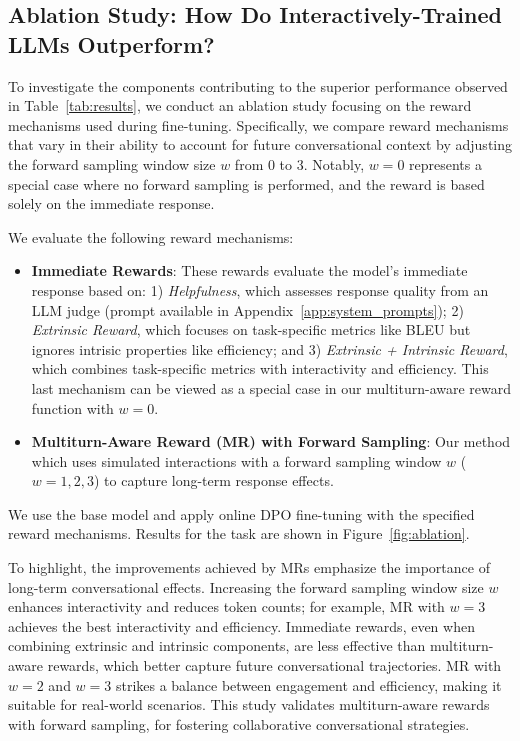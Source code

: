 \subsection{Ablation Study: How Do Interactively-Trained LLMs Outperform?}
\label{sec:ablation}

To investigate the components contributing to the superior performance observed in Table~\ref{tab:results}, we conduct an ablation study focusing on the reward mechanisms used during fine-tuning. Specifically, we compare reward mechanisms that vary in their ability to account for future conversational context by adjusting the forward sampling window size $w$ from 0 to 3. Notably, $w=0$ represents a special case where no forward sampling is performed, and the reward is based solely on the immediate response.

We evaluate the following reward mechanisms:
\begin{itemize}[leftmargin=*]
     \item \textbf{Immediate Rewards}: These rewards evaluate the model's immediate response based on:
        1) \textit{Helpfulness}, which assesses response quality from an LLM judge (prompt available in Appendix~\ref{app:system_prompts}); 
        2) \textit{Extrinsic Reward}, which focuses on task-specific metrics like BLEU but ignores intrisic properties like efficiency; and 
        3) \textit{Extrinsic + Intrinsic Reward}, which combines task-specific metrics with interactivity and efficiency. This last mechanism can be viewed as a special case in our multiturn-aware reward function with $w=0$.
    
    \item \textbf{Multiturn-Aware Reward (MR) with Forward Sampling}: Our method which uses simulated interactions with a forward sampling window $w$ ($w=1,2,3$) to capture long-term response effects.
\end{itemize}

We use the \llama base model and apply online DPO fine-tuning with the specified reward mechanisms. Results for the \doc task are shown in Figure~\ref{fig:ablation}.

To highlight, the improvements achieved by MRs emphasize the importance of long-term conversational effects. Increasing the forward sampling window size $w$ enhances interactivity and reduces token counts; for example, MR with $w=3$ achieves the best interactivity and efficiency. Immediate rewards, even when combining extrinsic and intrinsic components, are less effective than multiturn-aware rewards, which better capture future conversational trajectories. MR with $w=2$ and $w=3$ strikes a balance between engagement and efficiency, making it suitable for real-world scenarios. This study validates multiturn-aware rewards with forward sampling, for fostering collaborative conversational strategies.



